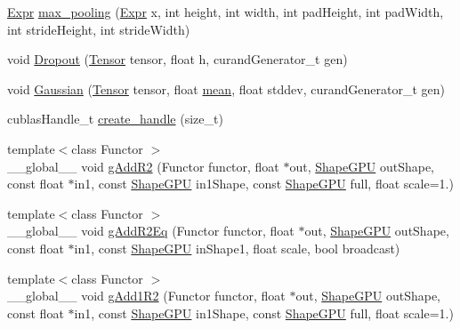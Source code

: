 \begin{DoxyCompactItemize}
\item 
\hyperlink{namespacemarian_a498d8baf75b754011078b890b39c8e12}{Expr} \hyperlink{namespacemarian_abfe3b8c37f479da0a31a1e843d8bdedf}{max\+\_\+pooling} (\hyperlink{namespacemarian_a498d8baf75b754011078b890b39c8e12}{Expr} x, int height, int width, int pad\+Height, int pad\+Width, int stride\+Height, int stride\+Width)
\item 
void \hyperlink{namespacemarian_a5f2633d87f49d6a2a46c44c7100013fc}{Dropout} (\hyperlink{namespacemarian_a88b71ec34bb354564cddc24eb80f7e14}{Tensor} tensor, float h, curand\+Generator\+\_\+t gen)
\item 
void \hyperlink{namespacemarian_a6fb26370e7acf6cf1fd9b03b6af6210e}{Gaussian} (\hyperlink{namespacemarian_a88b71ec34bb354564cddc24eb80f7e14}{Tensor} tensor, float \hyperlink{namespacemarian_a15ec9743709e47180378db974ddbf116}{mean}, float stddev, curand\+Generator\+\_\+t gen)
\item 
cublas\+Handle\+\_\+t \hyperlink{namespacemarian_aefcaef2db4de43d9bdd30a750da6e78b}{create\+\_\+handle} (size\+\_\+t)
\item 
{\footnotesize template$<$class Functor $>$ }\\\+\_\+\+\_\+global\+\_\+\+\_\+ void \hyperlink{namespacemarian_a6e23ca23d59f5e88256ee5257c412f2f}{g\+Add\+R2} (Functor functor, float $\ast$out, \hyperlink{structmarian_1_1ShapeGPU}{Shape\+G\+PU} out\+Shape, const float $\ast$in1, const \hyperlink{structmarian_1_1ShapeGPU}{Shape\+G\+PU} in1\+Shape, const \hyperlink{structmarian_1_1ShapeGPU}{Shape\+G\+PU} full, float scale=1.)
\item 
{\footnotesize template$<$class Functor $>$ }\\\+\_\+\+\_\+global\+\_\+\+\_\+ void \hyperlink{namespacemarian_a35418d90c9b90cff0b6a21d2e00c045a}{g\+Add\+R2\+Eq} (Functor functor, float $\ast$out, \hyperlink{structmarian_1_1ShapeGPU}{Shape\+G\+PU} out\+Shape, const float $\ast$in1, const \hyperlink{structmarian_1_1ShapeGPU}{Shape\+G\+PU} in\+Shape1, float scale, bool broadcast)
\item 
{\footnotesize template$<$class Functor $>$ }\\\+\_\+\+\_\+global\+\_\+\+\_\+ void \hyperlink{namespacemarian_a0e46ef4c37b91562f6b1debd5d1e3d8f}{g\+Add1\+R2} (Functor functor, float $\ast$out, \hyperlink{structmarian_1_1ShapeGPU}{Shape\+G\+PU} out\+Shape, const float $\ast$in1, const \hyperlink{structmarian_1_1ShapeGPU}{Shape\+G\+PU} in1\+Shape, const \hyperlink{structmarian_1_1ShapeGPU}{Shape\+G\+PU} full, float scale=1.)
\item 

\end{DoxyCompactItemize}
